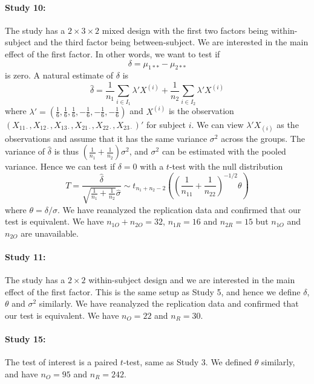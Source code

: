 \documentclass[11pt]{article}
\theoremstyle{definition}
\theoremstyle{custom}
\newcommand{\hdelta}{\hat{\delta}}
\newcommand{\hsigma}{\hat{\sigma}}
\begin{document}
  \paragraph{Study 10: \citet{GanorStern:2008hz}}
  The study has a $2 \times 3 \times 2$ mixed design with the first two factors being within-subject and the third factor being between-subject. We are interested in the main effect of the first factor. In other words, we want to test if
  \[
  \delta = \mu_{1**} - \mu_{2**}
  \]
  is zero. A natural estimate of $\delta$ is
  \[
  \hdelta = \frac{1}{n_1} \sum_{i \in I_1} \lambda' X^{(i)} + \frac{1}{n_2} \sum_{i \in I_2} \lambda' X^{(i)}
  \]
  where $\lambda' = (\frac{1}{6}, \frac{1}{6}, \frac{1}{6}, -\frac{1}{6}, -\frac{1}{6}, -\frac{1}{6})$ and $X^{(i)}$ is the observation $(X_{11 \cdot}, X_{12 \cdot}, X_{13 \cdot}, X_{21 \cdot}, X_{22 \cdot}, X_{23 \cdot})'$ for subject $i$. We can view $\lambda' X_{(i)}$ as the observations and assume that it has the same variance $\sigma^2$ across the groups. The variance of $\hdelta$ is thus $(\frac{1}{n_1} + \frac{1}{n_2}) \sigma^2$, and $\sigma^2$ can be estimated with the pooled variance. Hence we can test if $\delta = 0$ with a $t$-test with the null distribution
  \[
  T = \frac{\hdelta}{\sqrt{\frac{1}{n_1} + \frac{1}{n_2}} \hsigma} \sim t_{n_1 + n_2 - 2}\left(\left(\frac{1}{n_{11}} + \frac{1}{n_{22}}\right)^{-1/2} \theta\right)
  \]
  where $\theta = \delta / \sigma$. We have reanalyzed the replication data and confirmed that our test is equivalent. We have $n_{1O} + n_{2O} = 32$, $n_{1R} = 16$ and $n_{2R} = 15$ but $n_{1O}$ and $n_{2O}$ are unavailable.

  \paragraph{Study 11: \citet{Mirman:2008bz}}
  The study has a $2 \times 2$ within-subject design and we are interested in the main effect of the first factor. This is the same setup as Study 5, and hence we define $\delta$, $\theta$ and $\sigma^2$ similarly. We have reanalyzed the replication data and confirmed that our test is equivalent. We have $n_O = 22$ and $n_R = 30$.

  \paragraph{Study 15: \citet{Schmidt:2008cd}}
  The test of interest is a paired $t$-test, same as Study 3. We defined $\theta$ similarly, and have $n_O = 95$ and $n_R = 242$.
\end{document}
